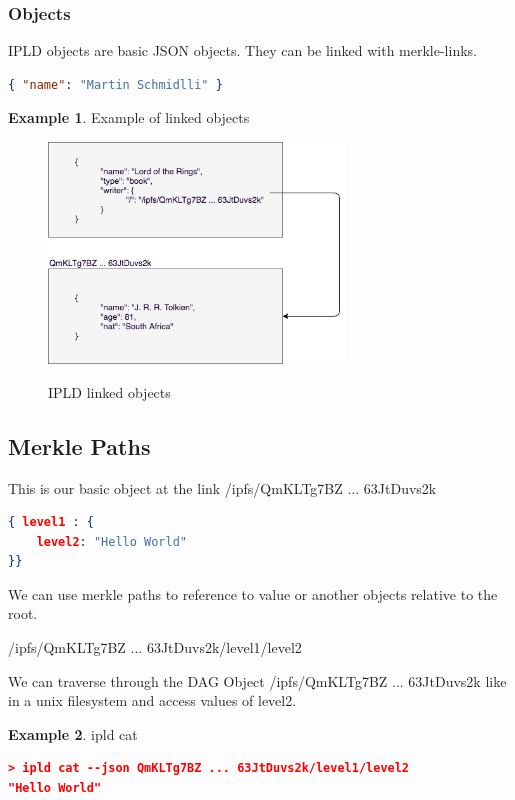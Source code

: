 \documentclass[a4paper,11pt, oneside]{report}
\theoremstyle{definition}
\newtheorem{exmp}{Example}[subsection]
\begin{document}
\subsubsection{Objects}
IPLD objects are basic JSON objects. They can be linked with merkle-links.
\begin{lstlisting}[language=json]
{ "name": "Martin Schmidlli" }
\end{lstlisting}

\begin{exmp} Example of linked objects
\begin{figure}[H]
\centering
\includegraphics[width=0.7\textwidth]{img/ipld-example.png}\\[0.8cm]
\caption[IPLD linked objects]{IPLD linked objects}
\end{figure}
\end{exmp}

\subsection{Merkle Paths}
This is our basic object at the link /ipfs/QmKLTg7BZ ... 63JtDuvs2k\\
\begin{lstlisting}[language=json]
{ level1 : {
	level2: "Hello World"
}}
\end{lstlisting}
We can use merkle paths to reference to value or another objects relative to the root.
\begin{center}
/ipfs/QmKLTg7BZ ... 63JtDuvs2k/level1/level2
\end{center}
We can traverse through the DAG Object /ipfs/QmKLTg7BZ ... 63JtDuvs2k like in a unix filesystem and access values of level2.
\begin{exmp} ipld cat
\begin{lstlisting}[language=json]
> ipld cat --json QmKLTg7BZ ... 63JtDuvs2k/level1/level2
"Hello World"
\end{lstlisting}
\end{exmp}
\end{document}
